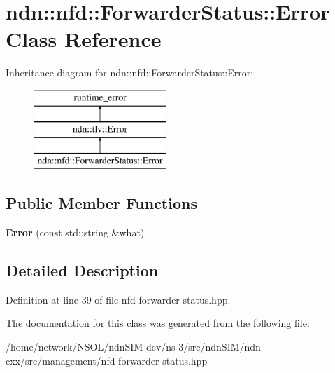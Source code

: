 \hypertarget{classndn_1_1nfd_1_1ForwarderStatus_1_1Error}{}\section{ndn\+:\+:nfd\+:\+:Forwarder\+Status\+:\+:Error Class Reference}
\label{classndn_1_1nfd_1_1ForwarderStatus_1_1Error}
Inheritance diagram for ndn\+:\+:nfd\+:\+:Forwarder\+Status\+:\+:Error\+:\begin{figure}[H]
\begin{center}
\leavevmode
\includegraphics[height=3.000000cm]{classndn_1_1nfd_1_1ForwarderStatus_1_1Error}
\end{center}
\end{figure}
\subsection*{Public Member Functions}
\begin{DoxyCompactItemize}
\item 
{\bfseries Error} (const std\+::string \&what)\hypertarget{classndn_1_1nfd_1_1ForwarderStatus_1_1Error_a299446cde94e08f4c876607e18b7ad78}{}\label{classndn_1_1nfd_1_1ForwarderStatus_1_1Error_a299446cde94e08f4c876607e18b7ad78}

\end{DoxyCompactItemize}


\subsection{Detailed Description}


Definition at line 39 of file nfd-\/forwarder-\/status.\+hpp.



The documentation for this class was generated from the following file\+:\begin{DoxyCompactItemize}
\item 
/home/network/\+N\+S\+O\+L/ndn\+S\+I\+M-\/dev/ns-\/3/src/ndn\+S\+I\+M/ndn-\/cxx/src/management/nfd-\/forwarder-\/status.\+hpp\end{DoxyCompactItemize}
